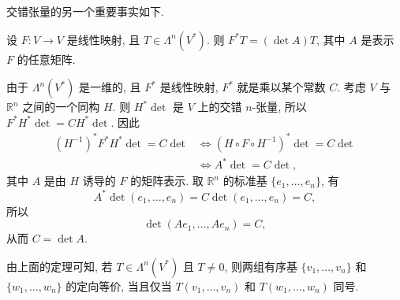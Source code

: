 交错张量的另一个重要事实如下.

\begin{RiemannTheorem}\label{thm:pullback-top-degree-determinant}
设 $F:V\to V$ 是线性映射, 且 $T\in\Lambda^n(V^*)$. 则 $F^*T=(\det A)T$, 其中 $A$ 是表示 $F$ 的任意矩阵.
\end{RiemannTheorem}

\begin{RiemannProof}
由于 $\Lambda^n(V^*)$ 是一维的, 且 $F^*$ 是线性映射, $F^*$ 就是乘以某个常数 $C$. 考虑 $V$ 与 $\mathbb{R}^n$ 之间的一个同构 $H$. 则 $H^*\det$ 是 $V$ 上的交错 $n$-张量, 所以 $F^*H^*\det=CH^*\det$. 因此
\begin{align*}
  (H^{-1})^*F^*H^*\det=C\det
  &\Leftrightarrow(H\circ F\circ H^{-1})^*\det=C\det\\
  &\Leftrightarrow A^*\det=C\det,
\end{align*}
其中 $A$ 是由 $H$ 诱导的 $F$ 的矩阵表示. 取 $\mathbb{R}^n$ 的标准基 $\{e_1,\ldots,e_n\}$, 有
\[
  A^*\det(e_1,\ldots,e_n)=C\det(e_1,\ldots,e_n)=C,
\]
所以
\[
  \det(Ae_1,\ldots,Ae_n)=C,
\]
从而 $C=\det A$.
\end{RiemannProof}

\begin{RiemannRemark}\label{rem:equivalent-orientations-and-top-tensors}
由上面的定理可知, 若 $T\in\Lambda^n(V^*)$ 且 $T\ne0$, 则两组有序基 $\{v_1,\ldots,v_n\}$ 和 $\{w_1,\ldots,w_n\}$ 的定向等价, 当且仅当 $T(v_1,\ldots,v_n)$ 和 $T(w_1,\ldots,w_n)$ 同号.
\end{RiemannRemark}

